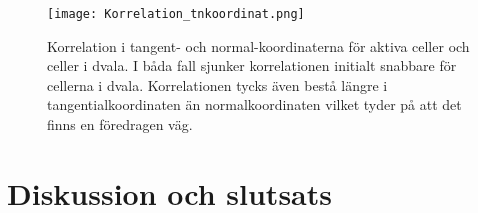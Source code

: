 \begin{figure}
    \centering
    \texttt{[image: Korrelation\_tnkoordinat.png]}
    \caption{Korrelation i tangent- och normal-koordinaterna för aktiva celler och celler i dvala. I båda fall sjunker korrelationen initialt snabbare för cellerna i dvala. Korrelationen tycks även bestå längre i tangentialkoordinaten än normalkoordinaten vilket tyder på att det finns en föredragen väg.}
    \label{fig:Korr_tn}
\end{figure}


\section{Diskussion och slutsats}







